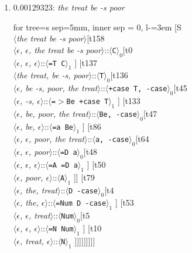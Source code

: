 \documentclass[11pt]{article}
\begin{document}
\begin{enumerate}
	\item  0.00129323: \textit{the treat be -s poor} \\[0.5em]
	\begin{forest}
	for tree={s sep=5mm, inner sep = 0, l-=3em}
	[S\\$\langle$\textit{the treat be -s poor}$\rangle$[t158\\$\langle$\textit{$\epsilon${,} $\epsilon${,} the treat be -s poor}$\rangle$::$\langle$\texttt{C}$\rangle_0$[t0\\$\langle$\textit{$\epsilon${,} $\epsilon${,} $\epsilon$}$\rangle$::$\langle$\texttt{{=}T C}$\rangle_1$ ] [t137\\$\langle$\textit{the treat{,} be -s{,} poor}$\rangle$::$\langle$\texttt{T}$\rangle_0$[t136\\$\langle$\textit{$\epsilon${,} be -s{,} poor{,} the treat}$\rangle$::$\langle$\texttt{+case T{,} -case}$\rangle_0$[t45\\$\langle$\textit{$\epsilon${,} -s{,} $\epsilon$}$\rangle$::$\langle$\texttt{{=}$>$Be +case T}$\rangle_1$ ] [t133\\$\langle$\textit{$\epsilon${,} be{,} poor{,} the treat}$\rangle$::$\langle$\texttt{Be{,} -case}$\rangle_0$[t47\\$\langle$\textit{$\epsilon${,} be{,} $\epsilon$}$\rangle$::$\langle$\texttt{{=}a Be}$\rangle_1$ ] [t86\\$\langle$\textit{$\epsilon${,} $\epsilon${,} poor{,} the treat}$\rangle$::$\langle$\texttt{a{,} -case}$\rangle_0$[t64\\$\langle$\textit{$\epsilon${,} $\epsilon${,} poor}$\rangle$::$\langle$\texttt{{=}D a}$\rangle_0$[t48\\$\langle$\textit{$\epsilon${,} $\epsilon${,} $\epsilon$}$\rangle$::$\langle$\texttt{{=}A {=}D a}$\rangle_1$ ] [t50\\$\langle$\textit{$\epsilon${,} poor{,} $\epsilon$}$\rangle$::$\langle$\texttt{A}$\rangle_1$ ]] [t79\\$\langle$\textit{$\epsilon${,} the{,} treat}$\rangle$::$\langle$\texttt{D -case}$\rangle_0$[t4\\$\langle$\textit{$\epsilon${,} the{,} $\epsilon$}$\rangle$::$\langle$\texttt{{=}Num D -case}$\rangle_1$ ] [t53\\$\langle$\textit{$\epsilon${,} $\epsilon${,} treat}$\rangle$::$\langle$\texttt{Num}$\rangle_0$[t5\\$\langle$\textit{$\epsilon${,} $\epsilon${,} $\epsilon$}$\rangle$::$\langle$\texttt{{=}N Num}$\rangle_1$ ] [t10\\$\langle$\textit{$\epsilon${,} treat{,} $\epsilon$}$\rangle$::$\langle$\texttt{N}$\rangle_1$ ]]]]]]]]]
	\end{forest}
	\newpage


\end{enumerate}
\end{document}
